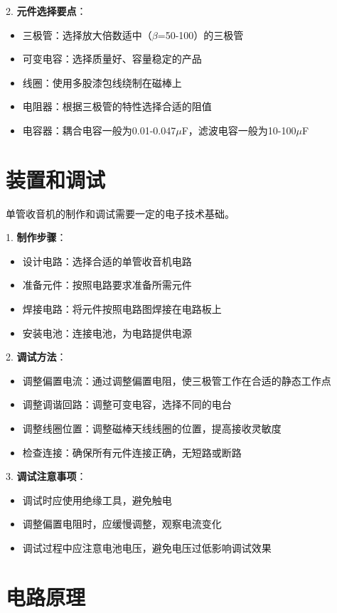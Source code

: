 \documentclass[12pt,UTF8]{ctexbook}
\begin{document}
2. \textbf{元件选择要点}：
   \begin{itemize}[leftmargin=3.5em]
   \item 三极管：选择放大倍数适中（$\beta$=50-100）的三极管
   \item 可变电容：选择质量好、容量稳定的产品
   \item 线圈：使用多股漆包线绕制在磁棒上
   \item 电阻器：根据三极管的特性选择合适的阻值
   \item 电容器：耦合电容一般为0.01-0.047$\mu$F，滤波电容一般为10-100$\mu$F
   \end{itemize}

\section{装置和调试}

单管收音机的制作和调试需要一定的电子技术基础。

1. \textbf{制作步骤}：
   \begin{itemize}[leftmargin=3.5em]
   \item 设计电路：选择合适的单管收音机电路
   \item 准备元件：按照电路要求准备所需元件
   \item 焊接电路：将元件按照电路图焊接在电路板上
   \item 安装电池：连接电池，为电路提供电源
   \end{itemize}

2. \textbf{调试方法}：
   \begin{itemize}[leftmargin=3.5em]
   \item 调整偏置电流：通过调整偏置电阻，使三极管工作在合适的静态工作点
   \item 调整调谐回路：调整可变电容，选择不同的电台
   \item 调整线圈位置：调整磁棒天线线圈的位置，提高接收灵敏度
   \item 检查连接：确保所有元件连接正确，无短路或断路
   \end{itemize}

3. \textbf{调试注意事项}：
   \begin{itemize}[leftmargin=3.5em]
   \item 调试时应使用绝缘工具，避免触电
   \item 调整偏置电阻时，应缓慢调整，观察电流变化
   \item 调试过程中应注意电池电压，避免电压过低影响调试效果
   \end{itemize}

\section{电路原理}
\end{document}
